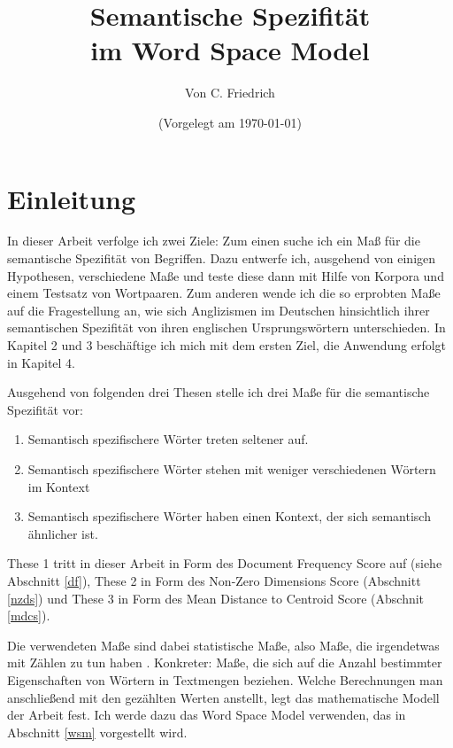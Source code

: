 \documentclass[11pt,numbers=noenddot]{scrartcl}
\title{Semantische Spezifität \\im Word Space Model}
\author{Von C. Friedrich}
\date{(Vorgelegt am \today)}
\begin{document}
\begin{titlepage}
\maketitle


\thispagestyle{empty}
\end{titlepage}

\tableofcontents
\newpage

\section{Einleitung}

In dieser Arbeit verfolge ich zwei Ziele: Zum einen suche ich ein Maß für die semantische Spezifität von Begriffen. Dazu entwerfe ich, ausgehend von einigen Hypothesen, verschiedene Maße und teste diese dann mit Hilfe von Korpora und einem Testsatz von Wortpaaren. Zum anderen wende ich die so erprobten Maße auf die Fragestellung an, wie sich Anglizismen im Deutschen hinsichtlich ihrer semantischen Spezifität von ihren englischen Ursprungswörtern unterschieden. In Kapitel 2 und 3 beschäftige ich mich mit dem ersten Ziel, die Anwendung erfolgt in Kapitel 4.

Ausgehend von folgenden drei Thesen stelle ich drei Maße für die semantische Spezifität vor:
\begin{enumerate}
    \item Semantisch spezifischere Wörter treten seltener auf.
    \item Semantisch spezifischere Wörter stehen mit weniger verschiedenen Wörtern im Kontext
    \item Semantisch spezifischere Wörter haben einen Kontext, der sich semantisch ähnlicher ist.
\end{enumerate}

These 1 tritt in dieser Arbeit in Form des Document Frequency Score auf (siehe Abschnitt \ref{df}), These 2 in Form des Non-Zero Dimensions Score (Abschnitt \ref{nzds}) und These 3 in Form des Mean Distance to Centroid Score (Abschnit \ref{mdcs}).

Die verwendeten Maße sind dabei statistische Maße, also Maße, die irgendetwas mit Zählen zu tun haben \citep[]{manning1999}. Konkreter: Maße, die sich auf die Anzahl bestimmter Eigenschaften von Wörtern in Textmengen beziehen. Welche Berechnungen man anschließend mit den gezählten Werten anstellt, legt das mathematische Modell der Arbeit fest. Ich werde dazu das Word Space Model verwenden, das in Abschnitt \ref{wsm} vorgestellt wird.
\end{document}
